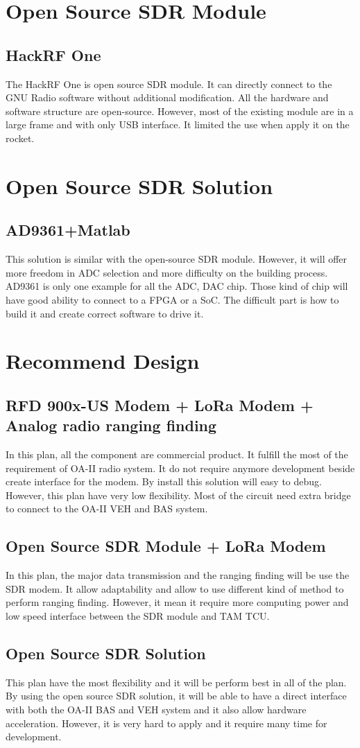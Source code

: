 \documentclass[12pt,article]{memoir}
\begin{document}
\chapter{Open Source SDR Module}
\section{HackRF One}
The HackRF One is open source SDR module. It can directly connect to the GNU Radio software without additional modification. All the hardware and software structure are open-source. However, most of the existing module are in a large frame and with only USB interface. It limited the use when apply it on the rocket.
\newpage
\chapter{Open Source SDR Solution}
\section{AD9361+Matlab}
This solution is similar with the open-source SDR module. However, it will offer more freedom in ADC selection and more difficulty on the building process. AD9361 is only one example for all the ADC, DAC chip. Those kind of chip will have good ability to connect to a FPGA or a SoC. The difficult part is how to build it and create correct software to drive it.
\newpage
\chapter{Recommend Design}
\section{RFD 900x-US Modem + LoRa Modem + Analog radio ranging finding} 
In this plan, all the component are commercial product. It fulfill the most of the requirement of OA-II radio system. It do not require anymore development beside create interface for the modem. By install this solution will easy to debug. However, this plan have very low flexibility. Most of the circuit need extra bridge to connect to the OA-II VEH and BAS system. 
\section{Open Source SDR Module + LoRa Modem}
In this plan, the major data transmission and the ranging finding will be use the SDR modem. It allow adaptability and allow to use different kind of method to perform ranging finding. However, it mean it require more computing power and low speed interface between the SDR module and TAM TCU.
\section{Open Source SDR Solution}
This plan have the most flexibility and it will be perform best in all of the plan. By using the open source SDR solution, it will be able to have a direct interface with both the OA-II BAS and VEH system and it also allow hardware acceleration. However, it is very hard to apply and it require many time for development.
\newpage
\end{document}
